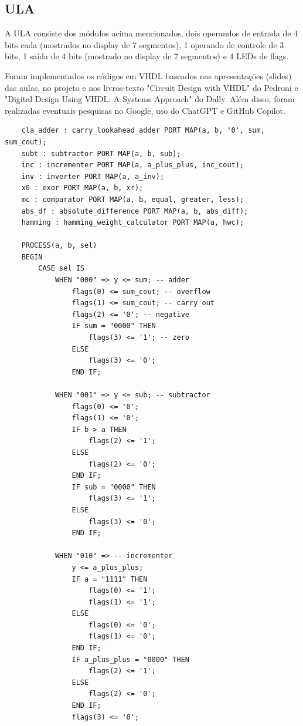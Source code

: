 \documentclass[12pt]{article}
\begin{document}
\subsection*{ULA}
A ULA consiste dos módulos acima mencionados, dois operandos de entrada de 4 bits cada (mostrados no display de 7 segmentos), 1 operando de controle de 3 bits, 1 saída de 4 bits (mostrado no display de 7 segmentos) e 4 LEDs de flags.

Foram implementados os códigos em VHDL baseados nas apresentações (slides) das aulas, no projeto e nos livros-texto "Circuit Design with VHDL" do Pedroni e "Digital Design Using VHDL: A Systems Approach" do Dally. Além disso, foram realizadas eventuais pesquisas no Google, uso do ChatGPT e GitHub Copilot.

\begin{verbatim}
    cla_adder : carry_lookahead_adder PORT MAP(a, b, '0', sum, sum_cout);
    subt : subtractor PORT MAP(a, b, sub);
    inc : incrementer PORT MAP(a, a_plus_plus, inc_cout);
    inv : inverter PORT MAP(a, a_inv);
    x0 : exor PORT MAP(a, b, xr);
    mc : comparator PORT MAP(a, b, equal, greater, less);
    abs_df : absolute_difference PORT MAP(a, b, abs_diff);
    hamming : hamming_weight_calculator PORT MAP(a, hwc);

    PROCESS(a, b, sel)
    BEGIN
        CASE sel IS
            WHEN "000" => y <= sum; -- adder
                flags(0) <= sum_cout; -- overflow
                flags(1) <= sum_cout; -- carry out
                flags(2) <= '0'; -- negative
                IF sum = "0000" THEN
                    flags(3) <= '1'; -- zero
                ELSE
                    flags(3) <= '0';
                END IF;

            WHEN "001" => y <= sub; -- subtractor
                flags(0) <= '0';
                flags(1) <= '0';
                IF b > a THEN
                    flags(2) <= '1';
                ELSE
                    flags(2) <= '0';
                END IF;
                IF sub = "0000" THEN
                    flags(3) <= '1';
                ELSE
                    flags(3) <= '0';
                END IF;

            WHEN "010" => -- incrementer
                y <= a_plus_plus;
                IF a = "1111" THEN
                    flags(0) <= '1';
                    flags(1) <= '1';
                ELSE
                    flags(0) <= '0';
                    flags(1) <= '0';
                END IF;
                IF a_plus_plus = "0000" THEN
                    flags(2) <= '1';
                ELSE
                    flags(2) <= '0';
                END IF;
                flags(3) <= '0';


\end{verbatim}
\end{document}
